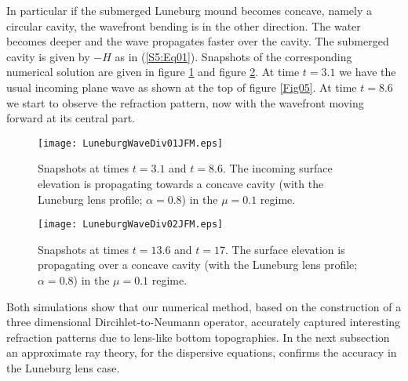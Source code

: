 

In particular if the submerged Luneburg mound becomes concave, namely a circular cavity, the wavefront bending is in the other 
direction. The water becomes deeper and the wave propagates faster over the cavity.
The submerged cavity is given by $-H$ as in (\ref{S5:Eq01}). Snapshots of the  corresponding
numerical solution are given in figure \ref{Fig07} and figure \ref{Fig08}. 
At time $t = 3.1$ we have the usual incoming plane wave as shown at the top of figure \ref{Fig05}. 
At time $t = 8.6$ we start to observe the refraction pattern, now with the wavefront moving forward at its central part. 

\begin{figure}
\centerline{\texttt{[image: LuneburgWaveDiv01JFM.eps]}}
\caption{
Snapshots  at times $t = 3.1$ and $t=8.6$.  The incoming surface elevation is propagating towards a concave cavity 
(with the Luneburg lens profile; $\alpha = 0.8$)  in the $\mu = 0.1$ regime. }
\label{Fig07}
\end{figure}


\begin{figure}
\centerline{\texttt{[image: LuneburgWaveDiv02JFM.eps]}}
\caption{
Snapshots  at times $t = 13.6$ and $t=17$.  The surface elevation is propagating over a concave cavity 
(with the Luneburg lens profile; $\alpha = 0.8$)  in the $\mu = 0.1$ regime.}
\label{Fig08}
\end{figure}

Both simulations show that our numerical method, based on the construction of a three dimensional Dircihlet-to-Neumann 
operator, accurately captured interesting refraction patterns due to lens-like bottom topographies. In the next subsection an
approximate ray theory, for the dispersive equations, confirms the accuracy in the Luneburg lens case. 

